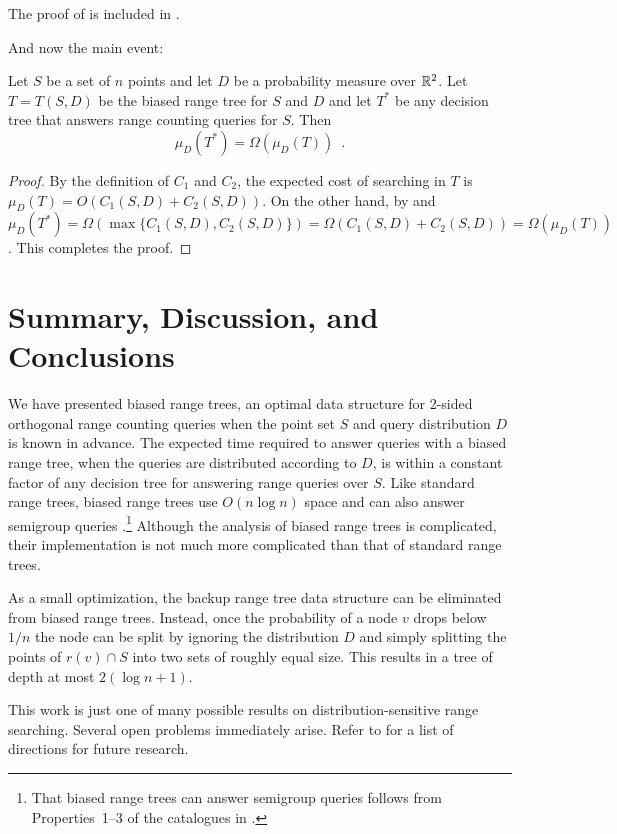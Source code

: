 \documentclass[charterfonts]{patmorin}
\begin{document}
The proof of  is included in .

And now the main event:

\begin{thm}
Let $S$ be a set of $n$ points and let $D$ be a probability measure
over $\mathbb{R}^2$.
Let $T=T(S,D)$ be the biased range tree for $S$ and $D$ and 
let $T^*$ be any decision
tree that answers range counting queries for $S$.  Then
\[
  \mu_D(T^*) = \Omega(\mu_D(T)) \enspace .
\]
\end{thm}

\begin{proof}
By the definition of $C_1$ and $C_2$, the expected cost of searching in
$T$ is $\mu_D(T)=O(C_1(S,D)+C_2(S,D))$.  On the other hand, by
 and  $\mu_D(T^*) =
\Omega(\max\{C_1(S,D),C_2(S,D)\}) =
\Omega(C_1(S,D)+C_2(S,D))=\Omega(\mu_D(T))$.  This completes the proof.
\end{proof}

\section{Summary, Discussion, and Conclusions}

We have presented biased range trees, an optimal data structure for
2-sided orthogonal range counting queries when the point set $S$ and
query distribution $D$ is known in advance. The expected time required
to answer queries with a biased range tree, when the queries are
distributed according to $D$, is within a constant factor of any
decision tree for answering range queries over $S$.  Like standard
range trees, biased range trees use $O(n\log n)$ space and can also
answer semigroup queries \cite{ae133,ae292}.\footnote{That biased
range trees can answer semigroup queries follows
from Properties~1--3 of the catalogues in .}
Although the analysis of
biased range trees is complicated, their implementation is not much
more complicated than that of standard range trees.

As a small optimization, the backup range tree data structure can be
eliminated from biased range trees.  Instead, once the probability of
a node $v$ drops below $1/n$ the node can be split by ignoring the
distribution $D$ and simply splitting the points of $r(v)\cap S$ into
two sets of roughly equal size.  This results in a tree of depth at
most $2(\log n+1)$.

This work is just one of many possible results on
distribution-sensitive range searching.  Several open problems
immediately arise.  Refer to  for a list of
directions for future research.
\end{document}
